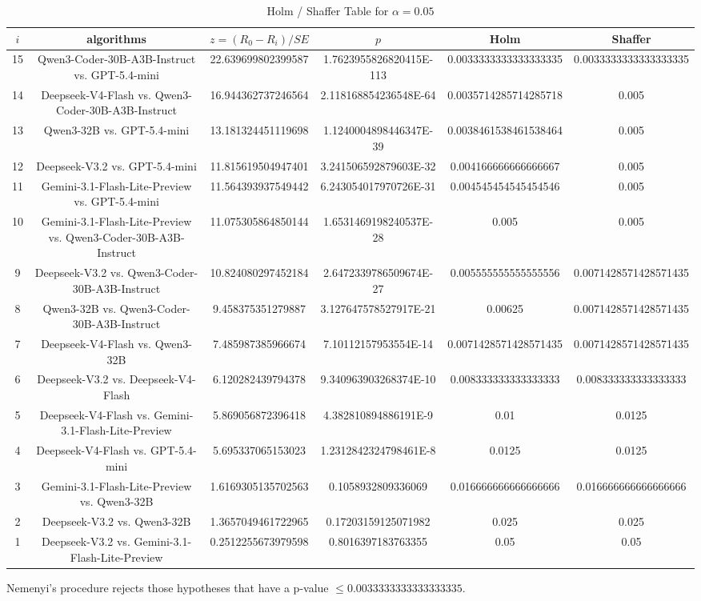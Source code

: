 \documentclass[a4paper,10pt]{article}
\begin{document}
\begin{landscape}
\begin{table}[!htp]
\centering\tiny
\caption{Holm / Shaffer Table for $\alpha=0.05$}
\begin{tabular}{cccccc}
$i$&algorithms&$z=(R_0 - R_i)/SE$&$p$&Holm&Shaffer\\
\hline
15&Qwen3-Coder-30B-A3B-Instruct vs. GPT-5.4-mini&22.639699802399587&1.7623955826820415E-113&0.0033333333333333335&0.0033333333333333335\\14&Deepseek-V4-Flash vs. Qwen3-Coder-30B-A3B-Instruct&16.944362737246564&2.118168854236548E-64&0.0035714285714285718&0.005\\13&Qwen3-32B vs. GPT-5.4-mini&13.181324451119698&1.1240004898446347E-39&0.0038461538461538464&0.005\\12&Deepseek-V3.2 vs. GPT-5.4-mini&11.815619504947401&3.241506592879603E-32&0.004166666666666667&0.005\\11&Gemini-3.1-Flash-Lite-Preview vs. GPT-5.4-mini&11.564393937549442&6.243054017970726E-31&0.004545454545454546&0.005\\10&Gemini-3.1-Flash-Lite-Preview vs. Qwen3-Coder-30B-A3B-Instruct&11.075305864850144&1.6531469198240537E-28&0.005&0.005\\9&Deepseek-V3.2 vs. Qwen3-Coder-30B-A3B-Instruct&10.824080297452184&2.6472339786509674E-27&0.005555555555555556&0.0071428571428571435\\8&Qwen3-32B vs. Qwen3-Coder-30B-A3B-Instruct&9.458375351279887&3.127647578527917E-21&0.00625&0.0071428571428571435\\7&Deepseek-V4-Flash vs. Qwen3-32B&7.485987385966674&7.10112157953554E-14&0.0071428571428571435&0.0071428571428571435\\6&Deepseek-V3.2 vs. Deepseek-V4-Flash&6.120282439794378&9.340963903268374E-10&0.008333333333333333&0.008333333333333333\\5&Deepseek-V4-Flash vs. Gemini-3.1-Flash-Lite-Preview&5.869056872396418&4.382810894886191E-9&0.01&0.0125\\4&Deepseek-V4-Flash vs. GPT-5.4-mini&5.695337065153023&1.2312842324798461E-8&0.0125&0.0125\\3&Gemini-3.1-Flash-Lite-Preview vs. Qwen3-32B&1.6169305135702563&0.1058932809336069&0.016666666666666666&0.016666666666666666\\2&Deepseek-V3.2 vs. Qwen3-32B&1.3657049461722965&0.17203159125071982&0.025&0.025\\1&Deepseek-V3.2 vs. Gemini-3.1-Flash-Lite-Preview&0.2512255673979598&0.8016397183763355&0.05&0.05\\\hline
\end{tabular}
\end{table}
Nemenyi's procedure rejects those hypotheses that have a p-value $\le0.0033333333333333335$.



\end{landscape}
\end{document}
